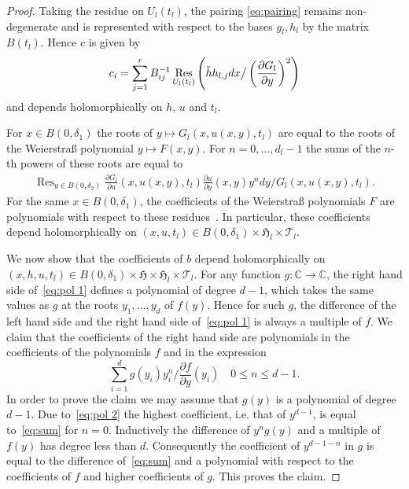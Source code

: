 \documentclass[11pt,twoside]{amsart}
\theoremstyle{plain}
\newcommand{\Tm}{\mathcal{T}}
\newcommand{\Sh}[1]{\mathcal{#1}} %
\DeclareMathOperator*{\Res}{Res}
\newcommand{\dfx}{dx}
\begin{document}
\begin{proof}
Taking the residue on $U_l(t_l)$, the pairing  \eqref {eq:pairing} remains non-degenerate 
and is represented with respect to the bases $ g_l, h_l$ by the matrix $B (t_l) $. Hence $c$ is given by
%
\begin{align}\label{eq:formula c}
c_i=\sum_{j=1}^rB^{-1}_{ij}\Res_{U_l(t_l)}\left(\Tilde{h}h_{l,j}\dfx\big/\left(\frac{\partial G_l}{\partial y}\right)^2\right)
\end{align}
%
and depends holomorphically on $h$, $u$ and $t_l$.

For $x\in B(0,\delta_1)$ the roots of $y\mapsto G_l(x,u(x,y),t_l)$ are equal to the roots of the Weierstra{\ss} polynomial $y\mapsto F(x,y)$.
For $n=0,\ldots, d_l -1$ the sums of the $n$-th powers of these roots are equal to
\begin{align*}
\Res_{y\in B(0,\delta_2)}
\frac{\partial G_l}{\partial u}(x,u(x,y),t_l)\frac{\partial u}{\partial y}(x,y)y^ndy\big/G_l(x,u(x,y),t_l).
\end{align*}
For the same $x\in B(0,\delta_1)$, the coefficients of the Weierstra{\ss} polynomials $F$ are  polynomials with respect to these residues~\cite[(2.14)]{Macdonald:79}. In particular, these coefficients depend holomorphically on $(x,u,t_l)\in B(0,\delta_1)\times\mathfrak {H}_l\times\Tm_l$.

We now show that the coefficients of $b$ depend holomorphically on $(x,h,u,t_l)\in B(0,\delta_1)\times\mathfrak {H}\times\mathfrak {H}_l\times\Tm_l$. For any function $g:\mathbb{C}\to\mathbb{C}$, the right hand side of~\eqref{eq:pol 1} defines a polynomial of degree $d-1$,  which takes the same values as $g$ at the roots $y_1,\ldots,y_d$ of $f(y)$. Hence for such $g$, the difference of the left hand side and the right hand side of~\eqref{eq:pol 1} is always a multiple of $f$. We claim that the coefficients of the right hand side are polynomials in the coefficients of the polynomials $f$ and in the expression
\begin{equation}\label{eq:sum}
\sum_{i=1}^dg(y_i)y_i^n\big/\frac{\partial f}{\partial y}(y_i)\quad
0\le n\le d-1.
\end{equation}
In order to prove the claim we may assume that $g(y)$ is a polynomial of degree $d-1$. Due to~\eqref{eq:pol 2} the highest coefficient, i.e. that of $y^{d-1}$, is equal to~\eqref{eq:sum} for $n=0$. Inductively the difference of $y^ng(y)$ and a multiple of $f(y)$ has degree less than $d$. Consequently the coefficient of $y^{d-1-n}$ in $ g $ is equal to the difference of~\eqref{eq:sum} and a polynomial with respect to the coefficients of $f$ and higher coefficients of $g$. This proves the claim.


\end{proof}
\end{document}
